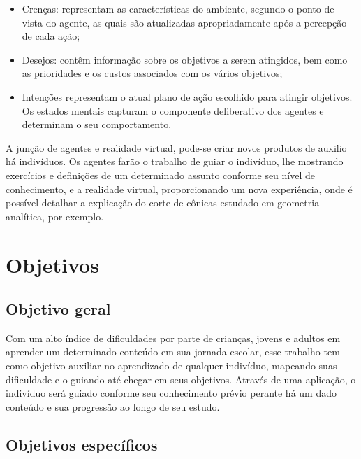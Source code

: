 \documentclass[12pt]{article}
\begin{document}
    \begin{itemize}

        \item Crenças: representam as características do ambiente, segundo o ponto de vista do
        agente, as quais são atualizadas apropriadamente após a percepção de cada ação;

        \item Desejos: contêm informação sobre os objetivos a serem atingidos, bem como as
        prioridades e os custos associados com os vários objetivos;

        \item Intenções representam o atual plano de ação escolhido para atingir objetivos. Os
        estados mentais capturam o componente deliberativo dos agentes e determinam o seu comportamento.

    \end{itemize}

    A junção de agentes e realidade virtual, pode-se criar novos produtos de auxilio há indivíduos.
    Os agentes farão o trabalho de guiar o indivíduo, lhe mostrando exercícios e definições de um
    determinado assunto conforme seu nível de conhecimento, e a realidade virtual, proporcionando um
    nova experiência, onde é possível detalhar a explicação do corte de cônicas estudado em
    geometria analítica, por exemplo.

\newpage
\section{Objetivos}

\subsection{Objetivo geral}

   \hspace*{5mm}Com um alto índice de dificuldades por parte de crianças, jovens e adultos em
    aprender um determinado conteúdo em sua jornada escolar, esse trabalho tem como objetivo auxiliar no
    aprendizado de qualquer indivíduo, mapeando suas dificuldade e o guiando até chegar em seus
    objetivos. Através de uma aplicação, o indivíduo será guiado conforme seu conhecimento prévio
    perante há um dado conteúdo e sua progressão ao longo de seu estudo.

\subsection{Objetivos específicos}
    \hspace*{5mm}
\end{document}

